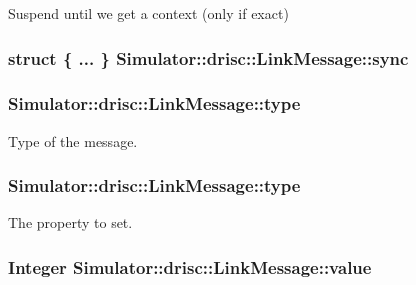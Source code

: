 Suspend until we get a context (only if exact) 

\hypertarget{struct_simulator_1_1drisc_1_1_link_message_a78c2f0c9540e1a5b6b1cdb46bbf9ca09}{
\subsubsection[{sync}]{\setlength{\rightskip}{0pt plus 5cm}struct \{ ... \}   Simulator\+::drisc\+::\+Link\+Message\+::sync}}\label{struct_simulator_1_1drisc_1_1_link_message_a78c2f0c9540e1a5b6b1cdb46bbf9ca09}
\hypertarget{struct_simulator_1_1drisc_1_1_link_message_a58f0ab57e00077944e169066734d9e6b}{
\subsubsection[{type}]{ Simulator\+::drisc\+::\+Link\+Message\+::type}}\label{struct_simulator_1_1drisc_1_1_link_message_a58f0ab57e00077944e169066734d9e6b}


Type of the message. 

\hypertarget{struct_simulator_1_1drisc_1_1_link_message_abf6d679c0dbd70baaf0efc98d02316f6}{
\subsubsection[{type}]{ Simulator\+::drisc\+::\+Link\+Message\+::type}}\label{struct_simulator_1_1drisc_1_1_link_message_abf6d679c0dbd70baaf0efc98d02316f6}


The property to set. 

\hypertarget{struct_simulator_1_1drisc_1_1_link_message_a5f4802c3875915d6e14abb3f9e2c6867}{
\subsubsection[{value}]{\setlength{\rightskip}{0pt plus 5cm}Integer Simulator\+::drisc\+::\+Link\+Message\+::value}}\label{struct_simulator_1_1drisc_1_1_link_message_a5f4802c3875915d6e14abb3f9e2c6867}


